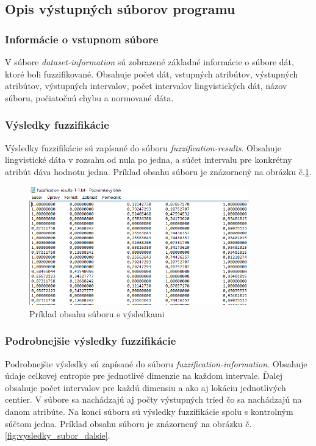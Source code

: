 \subsection{Opis výstupných súborov programu}
\subsubsection{Informácie o vstupnom súbore}
V  súbore \textit{dataset-information} sú zobrazené základné informácie o súbore dát, ktoré boli fuzzifikované. Obsahuje počet dát, vstupných atribútov, výstupných atribútov, výstupných intervalov, počet intervalov lingvistických dát, názov súboru, počiatočnú chybu a normované dáta.   

\subsubsection{Výsledky fuzzifikácie}
Výsledky fuzzifikácie sú zapísané do súboru  \textit{fuzzification-results}. Obsahuje lingvistické dáta v rozsahu od nula po jedna, a súčet intervalu pre konkrétny atribút dáva hodnotu jedna. Príklad obsahu súboru je znázornený na obrázku č.\ref{fig:vysledky_subor}. 

\begin{figure}[hp!]
\includegraphics[width=0.85\textwidth]{obrazky/obsah_suboru_-_fuzzification-results.PNG}
\centering
\caption{Príklad obsahu súboru s výsledkami} 
\label{fig:vysledky_subor}
\end{figure}



\subsubsection{Podrobnejšie výsledky fuzzifikácie}
Podrobnejšie výsledky sú zapísané do súboru \textit{fuzzification-information}. Obsahuje údaje celkovej entropie pre jednotlivé dimenzie na každom intervale. Ďalej obsahuje počet intervalov pre každú dimensiu a ako aj lokáciu jednotlivých centier. V súbore sa nachádzajú aj počty výstupných tried čo sa nachádzajú na danom atribúte. Na konci súboru sú výsledky fuzzifikácie spolu s kontrolným súčtom jedna. Príklad obsahu súboru je znázornený na obrázku č. \ref{fig:vysledky_subor_dalsie}. 

